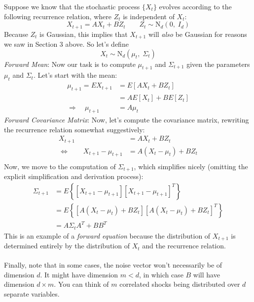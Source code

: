 \documentclass[a4paper,12pt]{scrartcl}
\begin{document}
Suppose we know that the stochastic process $\{{X}_t\}$
evolves according to the following recurrence relation,
where ${Z}_t$ is independent of ${X}_t$: 
\begin{equation}
    {X}_{t+1} = A {X}_t + B {Z}_t
    \qquad {Z}_t \sim \text{N}_d(0, \; I_d) 
\end{equation}
Because ${Z}_t$ is Gaussian, this implies that 
${X}_{t+1}$ will \emph{also} be Gaussian for reasons we saw  
in Section 3 above. So let's define
\begin{equation}
    {X}_t \sim \text{N}_d(\mu_t, \; \Sigma_t)
\end{equation}
{\sl Forward Mean}: 
Now our task is to compute $\mu_{t+1}$ and $\Sigma_{t+1}$
given the parameters $\mu_t$ and $\Sigma_t$.  Let's start with the
mean:
\begin{align*}
    \mu_{t+1} = E{X}_{t+1} &= E\left[A{X}_t +
	B {Z}_t\right] \\
    &= AE[{X}_t] + BE[{Z}_t] \\
    \Rightarrow \quad \mu_{t+1} &= A\mu_t
\end{align*}
{\sl Forward Covariance Matrix}:
Now, let's compute the covariance matrix, rewriting the recurrence 
relation somewhat suggestively:
\begin{align*}
    {X}_{t+1} &= A {X}_t + B {Z}_t \\
    \Leftrightarrow \qquad 
	{X}_{t+1} - \mu_{t+1} &= 
	A ({X}_t - \mu_t) + B {Z}_t \\
\end{align*}
Now, we move to the computation of $\Sigma_{t+1}$, which simplifies
nicely (omitting the explicit simplification and derivation process):
\begin{align*}
    \Sigma_{t+1} &= E\left\{ \left[{X}_{t+1} - \mu_{t+1} \right]
    \left[{X}_{t+1} - \mu_{t+1} \right]^T \right\} \\
    &= E\left\{ \left[A ({X}_t - \mu_t) + B {Z}_t\right]
	\left[A ({X}_t - \mu_t) + B {Z}_t\right]^T
	\right\} \\
    &= A\Sigma_t A^T + BB^T
\end{align*}
This is an example of a \emph{forward equation} because the 
distribution of ${X}_{t+1}$ is determined entirely by 
the distribution of ${X}_t$ and the recurrence relation.
\\
\\
Finally, note that in some cases, the noise vector won't necessarily
be of dimension $d$.  It might have dimension $m<d$, in which 
case $B$ will have dimension $d\times m$. You can think of 
$m$ correlated shocks being distributed over $d$ separate variables.
\end{document}
